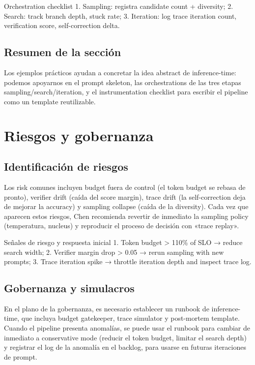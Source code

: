 \documentclass[a4paper]{article}
\begin{document}
\begin{knowledgebox}{Orchestration checklist}
1. Sampling: registra candidate count + diversity; 2. Search: track branch depth, stuck rate; 3. Iteration: log trace iteration count, verification score, self-correction delta.
\end{knowledgebox}

\subsection{Resumen de la sección}
Los ejemplos prácticos ayudan a concretar la idea abstract de inference-time: podemos apoyarnos en el prompt skeleton, las orchestrations de las tres etapas sampling/search/iteration, y el instrumentation checklist para escribir el pipeline como un template reutilizable.

\section{Riesgos y gobernanza}

\subsection{Identificación de riesgos}
Los risk comunes incluyen budget fuera de control (el token budget se rebasa de pronto), verifier drift (caída del score margin), trace drift (la self-correction deja de mejorar la accuracy) y sampling collapse (caída de la diversity). Cada vez que aparecen estos riesgos, Chen recomienda revertir de inmediato la sampling policy (temperatura, nucleus) y reproducir el proceso de decisión con «trace replay».

\begin{warningbox}{Señales de riesgo y respuesta inicial}
1. Token budget > 110\% of SLO → reduce search width; 2. Verifier margin drop > 0.05 → rerun sampling with new prompts; 3. Trace iteration spike → throttle iteration depth and inspect trace log.
\end{warningbox}

\subsection{Gobernanza y simulacros}
En el plano de la gobernanza, es necesario establecer un runbook de inference-time, que incluya budget gatekeeper, trace simulator y post-mortem template. Cuando el pipeline presenta anomalías, se puede usar el runbook para cambiar de inmediato a conservative mode (reducir el token budget, limitar el search depth) y registrar el log de la anomalía en el backlog, para usarse en futuras iteraciones de prompt.
\end{document}
